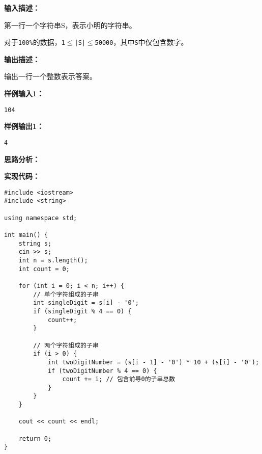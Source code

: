 \documentclass[a4paper]{ctexart}
\begin{document}
\noindent\textbf{输入描述：}
	
第一行一个字符串S，表示小明的字符串。

对于\texttt{100\%}的数据，\texttt{1$\leq$|S|$\leq$50000}，其中\texttt{S}中仅包含数字。
	
\noindent\textbf{输出描述：} 
	
输出一行一个整数表示答案。
	
\noindent\textbf{样例输入1：}
	
\lstset{numbers=none}
\begin{lstlisting}
104
\end{lstlisting}
\lstset{numbers=left}
	
\noindent\textbf{样例输出1：}
\lstset{numbers=none}
\begin{lstlisting}
4
\end{lstlisting}
\lstset{numbers=left}
	
\vspace{10pt}
	
\noindent\textbf{思路分析：}
	

	
\noindent\textbf{实现代码：}
	
\begin{lstlisting}
#include <iostream>
#include <string>

using namespace std;

int main() {
	string s;
	cin >> s;
	int n = s.length();
	int count = 0;
	
	for (int i = 0; i < n; i++) {
		// 单个字符组成的子串
		int singleDigit = s[i] - '0';
		if (singleDigit % 4 == 0) {
			count++;
		}
		
		// 两个字符组成的子串
		if (i > 0) {
			int twoDigitNumber = (s[i - 1] - '0') * 10 + (s[i] - '0');
			if (twoDigitNumber % 4 == 0) {
				count += i; // 包含前导0的子串总数
			}
		}
	}
	
	cout << count << endl;
	
	return 0;
}
\end{lstlisting}
	
	
\end{document}

